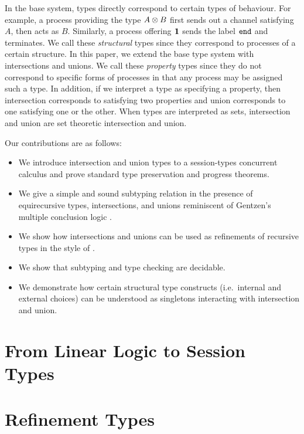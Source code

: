 \documentclass[a4paper,USenglish]{lipics-v2016}
\begin{document}
In the base system, types directly correspond to certain types of behaviour. For example, a process providing the type $A \otimes B$ first sends out a channel satisfying $A$, then acts as $B$. Similarly, a process offering $\mathbf{1}$ sends the label $\texttt{end}$ and terminates. We call these \emph{structural} types since they correspond to processes of a certain structure. In this paper, we extend the base type system with intersections and unions. We call these \emph{property} types since they do not correspond to specific forms of processes in that any process may be assigned such a type. In addition, if we interpret a type as specifying a property, then intersection corresponds to satisfying two properties and union corresponds to one satisfying one or the other. When types are interpreted as sets, intersection and union are set theoretic intersection and union. 


Our contributions are as follows:
\begin{itemize}
  \item We introduce intersection and union types to a session-types concurrent calculus and prove standard type preservation and progress theorems.
  \item We give a simple and sound subtyping relation in the presence of equirecursive types, intersections, and unions reminiscent of Gentzen's multiple conclusion logic \cite{Gentzen35, Girard87}.
  \item We show how intersections and unions can be used as refinements of recursive types in the style of \cite{FreemanP91}.
  \item We show that subtyping and type checking are decidable. 
  \item We demonstrate how certain structural type constructs (i.e.\ internal and external choices) can be understood as singletons interacting with intersection and union.
\end{itemize}

\section{From Linear Logic to Session Types}

\section{Refinement Types}
\end{document}
